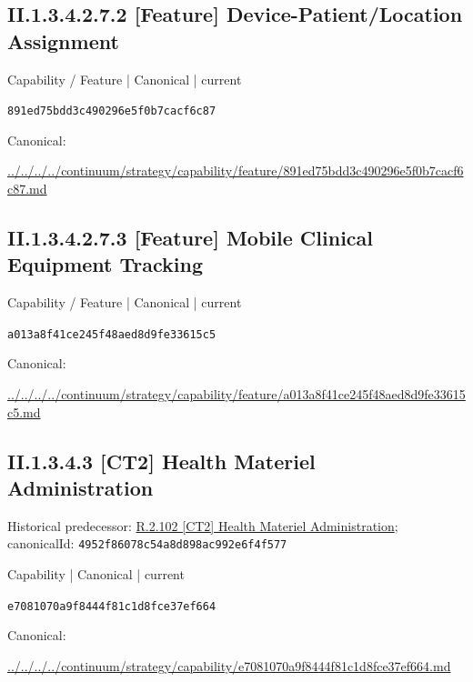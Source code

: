 \documentclass[10pt,a4paper]{article}
\begin{document}
\subsection*{II.1.3.4.2.7.2 [Feature] Device-Patient/Location Assignment}
\label{element-891ed75bdd3c490296e5f0b7cacf6c87}
{\small Capability / Feature | Canonical | current}\par
\texttt{891ed75bdd3c490296e5f0b7cacf6c87}\par
Canonical: \par
{\footnotesize\url{../../../../continuum/strategy/capability/feature/891ed75bdd3c490296e5f0b7cacf6c87.md}}\par
\subsection*{II.1.3.4.2.7.3 [Feature] Mobile Clinical Equipment Tracking}
\label{element-a013a8f41ce245f48aed8d9fe33615c5}
{\small Capability / Feature | Canonical | current}\par
\texttt{a013a8f41ce245f48aed8d9fe33615c5}\par
Canonical: \par
{\footnotesize\url{../../../../continuum/strategy/capability/feature/a013a8f41ce245f48aed8d9fe33615c5.md}}\par
\subsection*{II.1.3.4.3 [CT2] Health Materiel Administration}
Historical predecessor: \hyperref[element-4952f86078c54a8d898ac992e6f4f577]{R.2.102 [CT2] Health Materiel Administration}; canonicalId: \texttt{4952f86078c54a8d898ac992e6f4f577}\par
\label{element-e7081070a9f8444f81c1d8fce37ef664}
{\small Capability | Canonical | current}\par
\texttt{e7081070a9f8444f81c1d8fce37ef664}\par
Canonical: \par
{\footnotesize\url{../../../../continuum/strategy/capability/e7081070a9f8444f81c1d8fce37ef664.md}}\par
\end{document}
